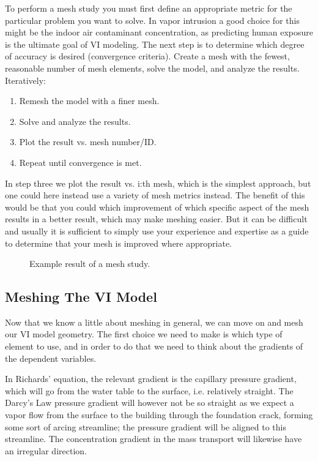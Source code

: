 To perform a mesh study you must first define an appropriate metric for the particular problem you want to solve.
In vapor intrusion a good choice for this might be the indoor air contaminant concentration, as predicting human exposure is the ultimate goal of VI modeling.
The next step is to determine which degree of accuracy is desired (convergence criteria).
Create a mesh with the fewest, reasonable number of mesh elements, solve the model, and analyze the results.
Iteratively:
\begin{enumerate}
  \item Remesh the model with a finer mesh.
  \item Solve and analyze the results.
  \item Plot the result vs. mesh number/ID.
  \item Repeat until convergence is met.
\end{enumerate}
In step three we plot the result vs. i:th mesh, which is the simplest approach, but one could here instead use a variety of mesh metrics instead.
The benefit of this would be that you could which improvement of which specific aspect of the mesh results in a better result, which may make meshing easier.
But it can be difficult and usually it is sufficient to simply use your experience and expertise as a guide to determine that your mesh is improved where appropriate.\par

\begin{figure}[htb!]
  \caption{Example result of a mesh study.}
  \label{fig:mesh_study}
\end{figure}

\subsection{Meshing The VI Model}

Now that we know a little about meshing in general, we can move on and mesh our VI model geometry.
The first choice we need to make is which type of element to use, and in order to do that we need to think about the gradients of the dependent variables.\par

In Richards' equation, the relevant gradient is the capillary pressure gradient, which will go from the water table to the surface, i.e. relatively straight.
The Darcy's Law pressure gradient will however not be so straight as we expect a vapor flow from the surface to the building through the foundation crack, forming some sort of arcing streamline; the pressure gradient will be aligned to this streamline.
The concentration gradient in the mass transport will likewise have an irregular direction.\par

